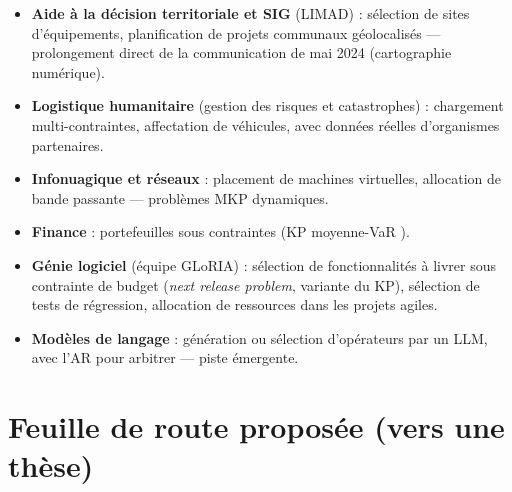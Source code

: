 \documentclass[
  french,
  11pt,
  a4paper,
]{article}
\providecommand{\tightlist}{%
  \setlength{\itemsep}{0pt}\setlength{\parskip}{0pt}}
\begin{document}
\begin{itemize}
\tightlist
\item
  \textbf{Aide à la décision territoriale et SIG} (LIMAD) : sélection de
  sites d'équipements, planification de projets communaux géolocalisés
  --- prolongement direct de la communication de mai 2024 (cartographie
  numérique).
\item
  \textbf{Logistique humanitaire} (gestion des risques et catastrophes)
  : chargement multi-contraintes, affectation de véhicules, avec données
  réelles d'organismes partenaires.
\item
  \textbf{Infonuagique et réseaux} : placement de machines virtuelles,
  allocation de bande passante --- problèmes MKP dynamiques.
\item
  \textbf{Finance} : portefeuilles sous contraintes (KP moyenne-VaR
  \autocite{vaezi_mean-var_2020}).
\item
  \textbf{Génie logiciel} (équipe GLoRIA) : sélection de fonctionnalités
  à livrer sous contrainte de budget (\emph{next release problem},
  variante du KP), sélection de tests de régression, allocation de
  ressources dans les projets agiles.
\item
  \textbf{Modèles de langage} : génération ou sélection d'opérateurs par
  un LLM, avec l'AR pour arbitrer --- piste émergente.
\end{itemize}

\section{Feuille de route proposée (vers une
thèse)}\label{perspectives-feuille-de-route-proposuxe9e-vers-une-thuxe8se}
\end{document}
